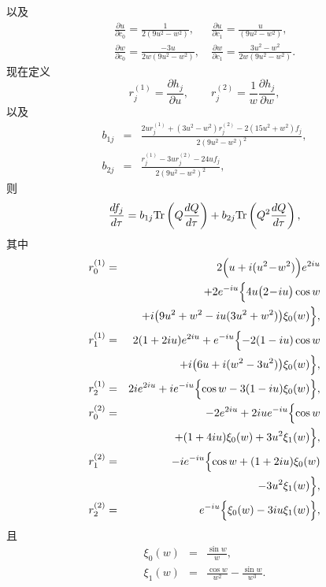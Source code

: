 以及
\begin{equation}
\begin{array}{ll}
\displaystyle\frac{\partial u}{\partial c_0}=\frac{1}{2(9u^2-w^2)}, &
\ \displaystyle \frac{\partial u}{\partial c_1}=\frac{u}{(9u^2-w^2)}, \\[5mm]
\displaystyle\frac{\partial w}{\partial c_0}=\frac{-3u}{2w(9u^2-w^2)}, &
\ \displaystyle \frac{\partial w}{\partial c_1}=\frac{3u^2-w^2}{2w(9u^2-w^2)}.
\end{array}
\end{equation}
现在定义
\begin{equation}
r_j^{(1)} = \frac{\partial h_j}{\partial u},\qquad
r_j^{(2)} =\frac{1}{w}\frac{\partial h_j}{\partial w},
\end{equation}
以及
\begin{eqnarray}
 b_{1j} &=& \frac{2ur_j^{(1)}+
    (3u^2\!-\!w^2)r^{(2)}_j-2(15u^2\!+\!w^2)f_j}{2(9u^2-w^2)^2},\\
 b_{2j}&=& \frac{r_j^{(1)}-3ur^{(2)}_j-24uf_j}{
   2(9u^2-w^2)^2},
\end{eqnarray}
则
\begin{equation}
 \frac{df_j}{d\tau}=b_{1j}\mbox{Tr}\left(Q\frac{dQ}{d\tau}\right)
   +b_{2j}\mbox{Tr}\left(Q^2\frac{dQ}{d\tau}\right),
\end{equation}
其中
\begin{eqnarray}
r^{(1)}_0 &=& 2\Bigl(u+i(u^2\!-\!w^2)\Bigr)e^{2i u}\nonumber\\
  &&+2e^{-i u}\Bigl\{
 4u\bigl(2\!-\!i u  \bigr)\cos w \nonumber\\
  && +i\bigl(9u^2+w^2-i u( 3u^2+w^2) \bigr)\xi_0( w)
  \Bigr\}, \\
r^{(1)}_1 &=& 2(1+2i u)e^{2i u}+e^{-i u}\Bigl\{
    -2(1-i u) \cos w \nonumber\\
  &&  +i\bigl( 6u +i(w^2-3u^2) \bigr)\xi_0( w)
   \Bigr\}, \\
r^{(1)}_2 &=&  2i e^{2i u}+i e^{-i u}\Bigl\{
   \cos w -3 (1-i  u)  \xi_0( w)
   \Bigr\},\\
r^{(2)}_0 &=& -2e^{2i u}+2i ue^{-i u}\Bigl\{
  \cos w \nonumber\\
  && +( 1+4i u) \xi_0( w)
  +3u^2\xi_1( w)\Bigr\}, \\
r^{(2)}_1 &=& -i e^{-i u}\Bigl\{
   \cos w  +(1+2i u)\xi_0( w)\nonumber\\
  &&-3u^2\xi_1( w)\Bigr\}, \\
r^{(2)}_2 &=&   e^{-i u}\Bigl\{
     \xi_0( w)
   -3i  u \xi_1( w)\Bigr\},
\end{eqnarray}
且
\begin{eqnarray}
 \xi_0(w) &=& \frac{\sin w}{w},\\
 \xi_1(w) &=& \frac{\cos w}{w^2}-\frac{\sin w}{w^3}.
\end{eqnarray}
